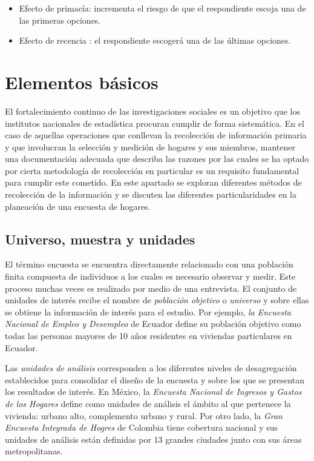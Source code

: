 \documentclass[
  10pt,
  spanish,
]{book}
\providecommand{\tightlist}{%
  \setlength{\itemsep}{0pt}\setlength{\parskip}{0pt}}
\begin{document}
\begin{itemize}
\tightlist
\item
  Efecto de primacía: incrementa el riesgo de que el respondiente escoja una de las primeras opciones.
\item
  Efecto de recencia : el respondiente escogerá una de las últimas opciones.
\end{itemize}

\hypertarget{elementos-buxe1sicos}{%
\chapter{Elementos básicos}\label{elementos-buxe1sicos}}

El fortalecimiento continuo de las investigaciones sociales es un objetivo que los institutos nacionales de estadística procuran cumplir de forma sistemática. En el caso de aquellas operaciones que conllevan la recolección de información primaria y que involucran la selección y medición de hogares y sus miembros, mantener una documentación adecuada que describa las razones por las cuales se ha optado por cierta metodología de recolección en particular es un requisito fundamental para cumplir este cometido. En este apartado se exploran diferentes métodos de recolección de la información y se discuten las diferentes particularidades en la planeación de una encuesta de hogares.

\hypertarget{universo-muestra-y-unidades}{%
\section{Universo, muestra y unidades}\label{universo-muestra-y-unidades}}

El término encuesta se encuentra directamente relacionado con una población finita compuesta de individuos a los cuales es necesario observar y medir. Este proceso muchas veces es realizado por medio de una entrevista. El conjunto de unidades de interés recibe el nombre de \emph{población objetivo} o \emph{universo} y sobre ellas se obtiene la información de interés para el estudio. Por ejemplo, \emph{la Encuesta Nacional de Empleo y Desempleo} de Ecuador define su población objetivo como todas las personas mayores de 10 años residentes en viviendas particulares en Ecuador.

Las \emph{unidades de análisis} corresponden a los diferentes niveles de desagregación establecidos para consolidar el diseño de la encuesta y sobre los que se presentan los resultados de interés. En México, la \emph{Encuesta Nacional de Ingresos y Gastos de los Hogares} define como unidades de análisis el ámbito al que pertenece la vivienda: urbano alto, complemento urbano y rural. Por otro lado, la \emph{Gran Encuesta Integrada de Hogres} de Colombia tiene cobertura nacional y sus unidades de análisis están definidas por 13 grandes ciudades junto con sus áreas metropolitanas.
\end{document}
